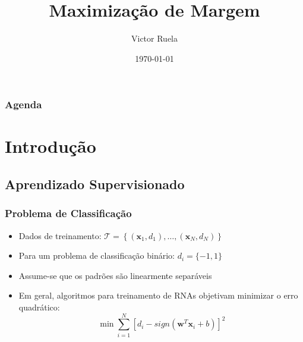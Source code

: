 \documentclass{beamer}
\title[Otimização em Redes 2020/1]{Maximização de Margem} %
\author{Victor Ruela} %
\institute[PPGEE - UFMG] %
{
Programa de Pós-Graduação em Engenharia Elétrica\\ Universidade Federal de Minas Gerais \\ %
\medskip
\textit{victorspruela@ufmg.br} %
}
\date{\today} %
\begin{document}
\begin{frame}
\titlepage %
\end{frame}

\begin{frame}
\frametitle{Agenda} %
\tableofcontents %
\end{frame}


\section{Introdução} %

\subsection{Aprendizado Supervisionado}

\begin{frame}
	\frametitle{Problema de Classificação}
	\begin{itemize}
		\item Dados de treinamento: $\mathcal{T} = \left\lbrace (\textbf{x}_1, d_1), \dots, (\textbf{x}_N, d_N)\right\rbrace $
		\item Para um problema de classificação binário: $d_i = \{ -1, 1 \} $
		\item Assume-se que os padrões são linearmente separáveis
		\item Em geral, algoritmos para treinamento de RNAs objetivam minimizar o erro quadrático:
		\begin{equation}
			\min \sum_{i=1}^{N} [d_i - sign(\textbf{w}^T\textbf{x}_i + b)]^2
			\label{eq:sqrd}
		\end{equation}
		
	\end{itemize}

\end{frame}
\end{document}
